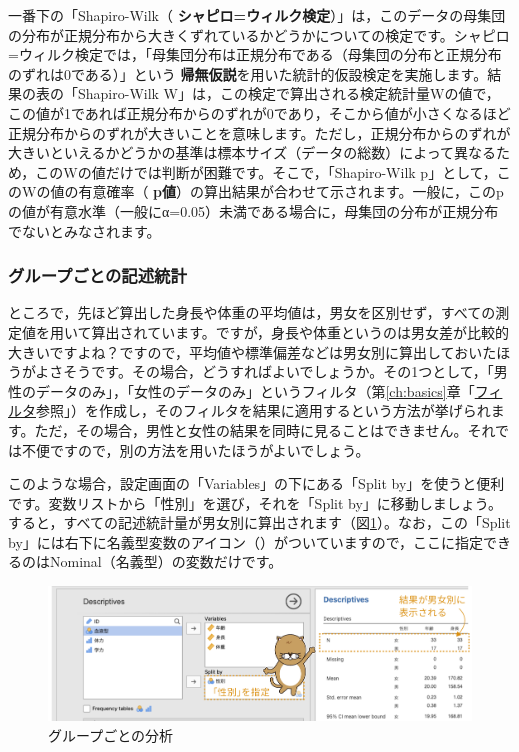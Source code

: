\documentclass[
  12pt,
  a5jpaper,
  lualatex, ja=standard]{bxjsbook}
\renewcommand{\emph}[1]{\textbf{\color{emph} #1}}
\newcommand{\infig}[1]{\raisebox{-.2\zh}{\texttt{[image: images/assets/\#1]}}}
\begin{document}
一番下の「Shapiro-Wilk（\emph{シャピロ=ウィルク検定}）」は，このデータの母集団の分布が正規分布から大きくずれているかどうかについての検定です。シャピロ=ウィルク検定では，「母集団分布は正規分布である（母集団の分布と正規分布のずれは0である）」という\emph{帰無仮説}を用いた統計的仮設検定を実施します。結果の表の「Shapiro-Wilk W」は，この検定で算出される検定統計量Wの値で，この値が1であれば正規分布からのずれが0であり，そこから値が小さくなるほど正規分布からのずれが大きいことを意味します。ただし，正規分布からのずれが大きいといえるかどうかの基準は標本サイズ（データの総数）によって異なるため，このWの値だけでは判断が困難です。そこで，「Shapiro-Wilk p」として，このWの値の有意確率（\emph{p値}）の算出結果が合わせて示されます。一般に，このpの値が有意水準（一般にα=0.05）未満である場合に，母集団の分布が正規分布でないとみなされます。

\hypertarget{subsub:exp-groupby}{%
\subsubsection*{グループごとの記述統計}\label{subsub:exp-groupby}}

ところで，先ほど算出した身長や体重の平均値は，男女を区別せず，すべての測定値を用いて算出されています。ですが，身長や体重というのは男女差が比較的大きいですよね？ですので，平均値や標準偏差などは男女別に算出しておいたほうがよさそうです。その場合，どうすればよいでしょうか。その1つとして，「男性のデータのみ」，「女性のデータのみ」というフィルタ（第\ref{ch:basics}章「\protect\hyperlink{sec:data-filter}{フィルタ}参照」）を作成し，そのフィルタを結果に適用するという方法が挙げられます。ただ，その場合，男性と女性の結果を同時に見ることはできません。それでは不便ですので，別の方法を用いたほうがよいでしょう。

このような場合，設定画面の「Variables」の下にある「Split by」を使うと便利です。変数リストから「性別」を選び，それを「Split by」に移動しましょう。すると，すべての記述統計量が男女別に算出されます（図\ref{fig:Exploration-descriptives-split-by}）。なお，この「Split by」には右下に名義型変数のアイコン（\infig{variable-nominal.pdf}）がついていますので，ここに指定できるのはNominal（名義型）の変数だけです。

\begin{figure}[!ht]

{\centering \includegraphics[width=1\linewidth]{images/exploration/Exploration-descriptives-split-by} 

}

\caption{グループごとの分析}\label{fig:Exploration-descriptives-split-by}
\end{figure}
\end{document}
